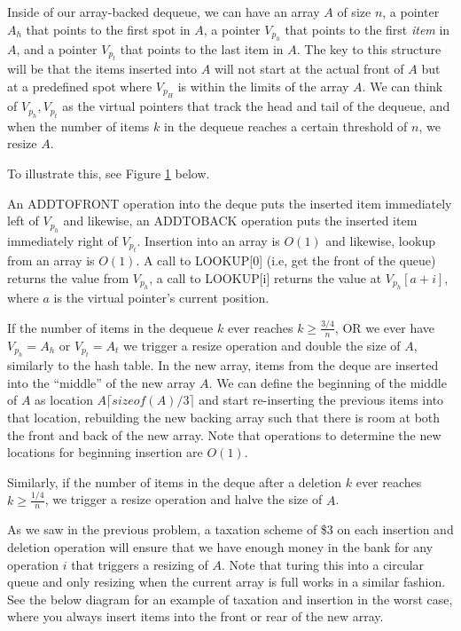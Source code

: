 \documentclass[titlepage]{article}\usepackage[]{graphicx}\usepackage[]{color}
\begin{document}
Inside of our array-backed dequeue, we can have an array $A$ of size $n$, a pointer
$A_h$ that points to the first spot in $A$, a pointer $V_{p_h}$ that points to
the first \textit{item} in $A$, and a pointer $V_{p_t}$ that points to the last
item in $A$. The key to this structure will be that the items inserted into $A$
will not start at the actual front of $A$ but at a predefined spot where
$V_{p_H}$ is within the limits of the array $A$. We can think of $V_{p_h},
V_{p_t}$ as the virtual pointers that track the head and tail of the dequeue,
and when the number of items $k$ in the dequeue reaches a certain threshold of
$n$, we resize $A$. 

To illustrate this, see Figure \ref{fig:deque} below.

\begin{figure}
	\label{fig:deque}

\end{figure}
An ADDTOFRONT operation into the deque puts the inserted item immediately left of
$V_{p_h}$ and likewise, an ADDTOBACK operation puts the inserted item
immediately right of $V_{p_t}$. Insertion into an array is $O(1)$ and likewise,
lookup from an array is $O(1)$. A call to LOOKUP[0] (i.e, get the front of the
queue) returns the value from $V_{p_h}$, a call to LOOKUP[i] returns the value
at $V_{p_h}[a+i]$, where $a$ is the virtual pointer's current position.

If the number of items in the dequeue $k$ ever reaches $ k \geq \frac{3/4}n$,
OR we ever have $V_{p_h} = A_h$ or $V_{p_t} = A_t$ we trigger a resize
operation and double the size of $A$, similarly to the hash table. In the new
array, items from the deque are inserted into the ``middle'' of the new array
$A$. We can define the beginning of the middle of $A$ as location
$A\lceil sizeof(A)/3 \rceil $ and start re-inserting the previous items into that location,
rebuilding the new backing array such that there is room at both the front
and back of the new array. Note that operations to determine the new
locations for beginning insertion are $O(1)$.

Similarly, if the number of items in the deque after a deletion $k$ 
ever reaches $ k \geq \frac{1/4}n$, we trigger a resize
operation and halve the size of $A$. 

As we saw in the previous problem, a taxation scheme of \$3 on each insertion
and deletion operation will ensure that we have enough money in the bank for
any operation $i$ that triggers a resizing of $A$. Note that turing this into a
circular queue and only resizing when the current array is full works in a
similar fashion. See the below diagram for an example of taxation and insertion
in the worst case, where you always insert items into the front or rear of the
new array.
\end{document}
